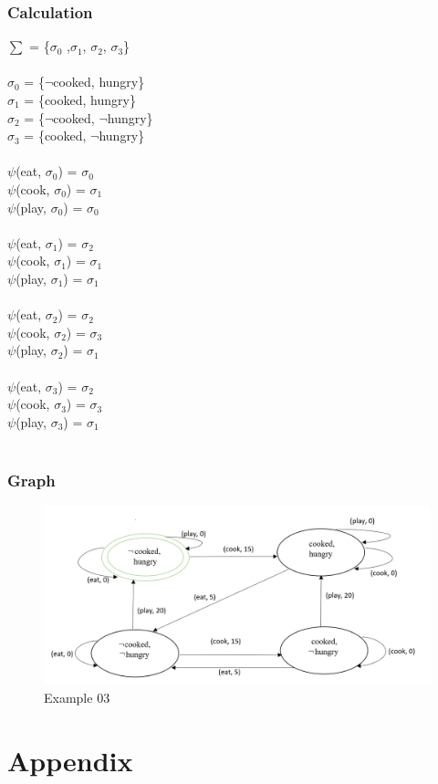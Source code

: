\documentclass[11pt]{article}
\begin{document}
	\subsubsection{Calculation}\label{par:p303}
	$\sum$ = \{$\sigma_{0}$ ,$\sigma_{1}$, $\sigma_{2}$, $\sigma_{3}$\}\\
	\\
	$\sigma_{0}$ = \{$\neg$cooked, hungry\}\\
	$\sigma_{1}$ = \{cooked, hungry\}\\
	$\sigma_{2}$ = \{$\neg$cooked, $\neg$hungry\}\\
	$\sigma_{3}$ = \{cooked, $\neg$hungry\}\\
	\\
	$\psi$(eat, $\sigma_{0}$) = $\sigma_{0}$\\
	$\psi$(cook, $\sigma_{0}$) = $\sigma_{1}$\\
	$\psi$(play, $\sigma_{0}$) = $\sigma_{0}$\\
	\\
	$\psi$(eat, $\sigma_{1}$) = $\sigma_{2}$\\
	$\psi$(cook, $\sigma_{1}$) = $\sigma_{1}$\\
	$\psi$(play, $\sigma_{1}$) = $\sigma_{1}$\\
	\\
	$\psi$(eat, $\sigma_{2}$) = $\sigma_{2}$\\
	$\psi$(cook, $\sigma_{2}$) = $\sigma_{3}$\\
	$\psi$(play, $\sigma_{2}$) = $\sigma_{1}$\\
	\\
	$\psi$(eat, $\sigma_{3}$) = $\sigma_{2}$\\
	$\psi$(cook, $\sigma_{3}$) = $\sigma_{3}$\\
	$\psi$(play, $\sigma_{3}$) = $\sigma_{1}$\\
	\\
	\subsubsection{Graph}\label{par:p403}
	\begin{figure}[H]
		\includegraphics[width=1\linewidth, height=0.3\textheight]{./media/figure01.png}
		\caption{Example 03}
		\label{Figure:f03}
	\end{figure}
	\newpage
	\section{Appendix}	
	\begin{appendix}
		\listoffigures
		\listoftables
	\end{appendix}
\end{document}
